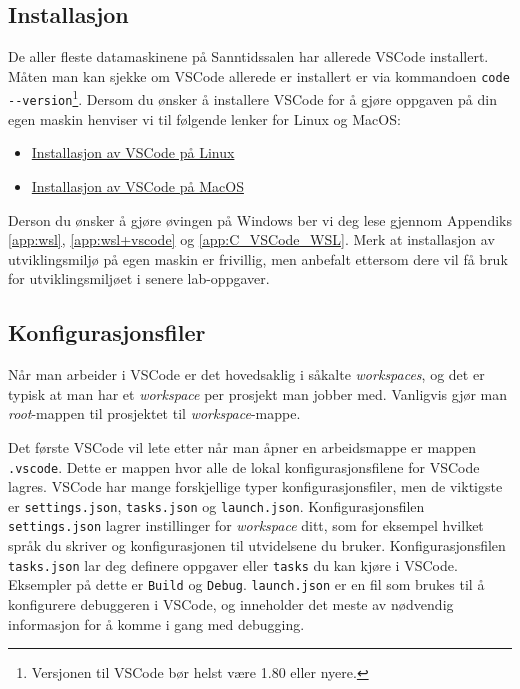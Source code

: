 \subsection{Installasjon}

De aller fleste datamaskinene på Sanntidssalen har allerede VSCode installert. Måten man kan sjekke om VSCode allerede er installert er via kommandoen \verb|code --version|\footnote{Versjonen til VSCode bør helst være 1.80 eller nyere.}. Dersom du ønsker å installere VSCode for å gjøre oppgaven på din egen maskin henviser vi til følgende lenker for Linux og MacOS:

\begin{itemize}
    \item \href{https://code.visualstudio.com/docs/setup/linux}{Installasjon av VSCode på Linux}
    \item \href{https://code.visualstudio.com/docs/setup/mac}{Installasjon av VSCode på MacOS}
\end{itemize}

Derson du ønsker å gjøre øvingen på Windows ber vi deg lese gjennom Appendiks \ref{app:wsl}, \ref{app:wsl+vscode} og \ref{app:C_VSCode_WSL}. Merk at installasjon av utviklingsmiljø på egen maskin er frivillig, men anbefalt ettersom dere vil få bruk for utviklingsmiljøet i senere lab-oppgaver.

\subsection{Konfigurasjonsfiler}
Når man arbeider i VSCode er det hovedsaklig i såkalte \textit{workspaces}, og det er typisk at man har et \textit{workspace} per prosjekt man jobber med. Vanligvis gjør man \textit{root}-mappen til prosjektet til \textit{workspace}-mappe. 

Det første VSCode vil lete etter når man åpner en arbeidsmappe er mappen \verb|.vscode|. Dette er mappen hvor alle de lokal konfigurasjonsfilene for VSCode lagres. VSCode har mange forskjellige typer konfigurasjonsfiler, men de viktigste er \verb|settings.json|, \verb|tasks.json| og \verb|launch.json|. Konfigurasjonsfilen \verb|settings.json| lagrer instillinger for \textit{workspace} ditt, som for eksempel hvilket språk du skriver og konfigurasjonen til utvidelsene du bruker. Konfigurasjonsfilen \verb|tasks.json| lar deg definere oppgaver eller \verb|tasks| du kan kjøre i VSCode. Eksempler på dette er \verb|Build| og \verb|Debug|. \verb|launch.json| er en fil som brukes til å konfigurere debuggeren i VSCode, og inneholder det meste av nødvendig informasjon for å komme i gang med debugging.

